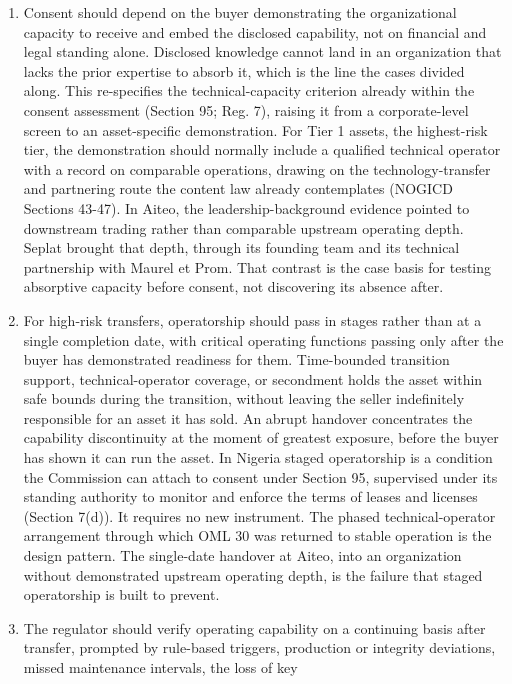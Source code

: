 \documentclass[twoside,fontset=lmodern]{mitthesis}
\begin{document}
\begin{enumerate}
  to secure.
\item
  Consent should depend on the buyer demonstrating the organizational
  capacity to receive and embed the disclosed capability, not on
  financial and legal standing alone. Disclosed knowledge cannot land in
  an organization that lacks the prior expertise to absorb it, which is
  the line the cases divided along. This re-specifies the
  technical-capacity criterion already within the consent assessment
  (Section 95; Reg. 7), raising it from a corporate-level screen to an
  asset-specific demonstration. For Tier 1 assets, the highest-risk
  tier, the demonstration should normally include a qualified technical
  operator with a record on comparable operations, drawing on the
  technology-transfer and partnering route the content law already
  contemplates (NOGICD Sections 43-47). In Aiteo, the
  leadership-background evidence pointed to downstream trading rather
  than comparable upstream operating depth. Seplat brought that depth,
  through its founding team and its technical partnership with Maurel et
  Prom. That contrast is the case basis for testing absorptive capacity
  before consent, not discovering its absence after.
\item
  For high-risk transfers, operatorship should pass in stages rather
  than at a single completion date, with critical operating functions
  passing only after the buyer has demonstrated readiness for them.
  Time-bounded transition support, technical-operator coverage, or
  secondment holds the asset within safe bounds during the transition,
  without leaving the seller indefinitely responsible for an asset it
  has sold. An abrupt handover concentrates the capability discontinuity
  at the moment of greatest exposure, before the buyer has shown it can
  run the asset. In Nigeria staged operatorship is a condition the
  Commission can attach to consent under Section 95, supervised under
  its standing authority to monitor and enforce the terms of leases and
  licenses (Section 7(d)). It requires no new instrument. The phased
  technical-operator arrangement through which OML 30 was returned to
  stable operation is the design pattern. The single-date handover at
  Aiteo, into an organization without demonstrated upstream operating
  depth, is the failure that staged operatorship is built to prevent.
\item
  The regulator should verify operating capability on a continuing basis
  after transfer, prompted by rule-based triggers, production or
  integrity deviations, missed maintenance intervals, the loss of key

\end{enumerate}
\end{document}
